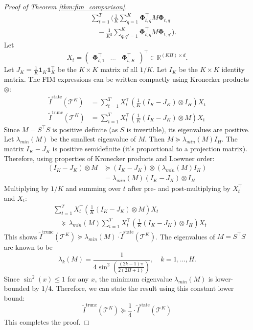 \documentclass{article}
\newcommand{\bPhi}{\mathbf{\Phi}}
\begin{document}
\begin{proof}[Proof of Theorem \ref{thm:fim_comparison}]
\begin{align*}
&\quad \sum_{t=1}^T \Bigg(
\frac{1}{K} \sum_{q=1}^K \bPhi_{t,q}^\top M \bPhi_{t,q} \\
&\qquad - \frac{1}{K^2} \sum_{q,q'=1}^K \bPhi_{t,q}^\top M \bPhi_{t,q'} \Bigg).
\end{align*}
Let
\[
X_t = \begin{pmatrix} \bPhi_{t,1}^\top & \dots & \bPhi_{t,K}^\top \end{pmatrix}^\top \in \mathbb{R}^{(KH) \times d}.
\]
Let $J_K = \frac{1}{K} \mathbf{1}_K \mathbf{1}_K^\top$ be the $K \times K$ matrix of all $1/K$.
Let $I_K$ be the $K \times K$ identity matrix.
The FIM expressions can be written compactly using Kronecker products $\otimes$:
\begin{align*}
\tilde{I}^{\text{state}}(\mathcal{T}^K) &= \sum_{t=1}^T X_t^\top \left( \frac{1}{K} (I_K - J_K) \otimes I_H \right) X_t \\
\tilde{I}^{\text{trunc}}(\mathcal{T}^K) &= \sum_{t=1}^T X_t^\top \left( \frac{1}{K} (I_K - J_K) \otimes M \right) X_t
\end{align*}
Since $M = S^\top S$ is positive definite (as $S$ is invertible), its eigenvalues are positive. Let $\lambda_{min}(M)$ be the smallest eigenvalue of $M$. Then $M \succeq \lambda_{min}(M) I_H$.
The matrix $I_K - J_K$ is positive semidefinite (it's proportional to a projection matrix).
Therefore, using properties of Kronecker products and Loewner order:
\begin{align*}
(I_K - J_K) \otimes M
&\succeq (I_K - J_K) \otimes (\lambda_{min}(M) I_H) \\
&= \lambda_{min}(M) (I_K - J_K) \otimes I_H
\end{align*}
Multiplying by $1/K$ and summing over $t$ after pre- and post-multiplying by $X_t^\top$ and $X_t$:
\begin{align*}
&\sum_{t=1}^T X_t^\top \left( \frac{1}{K} (I_K - J_K) \otimes M \right) X_t \\
&\quad \succeq \lambda_{min}(M) \sum_{t=1}^T X_t^\top \left( \frac{1}{K} (I_K - J_K) \otimes I_H \right) X_t
\end{align*}
This shows $\tilde{I}^{\text{trunc}}(\mathcal{T}^K) \succeq \lambda_{min}(M) \cdot \tilde{I}^{\text{state}}(\mathcal{T}^K)$.
The eigenvalues of $M=S^\top S$ are known to be
\[
\lambda_k(M) = \frac{1}{4 \sin^2\left(\frac{(2k-1)\pi}{2(2H+1)}\right)}, \quad k=1, \dots, H.
\]
Since $\sin^2(x) \le 1$ for any $x$, the minimum eigenvalue $\lambda_{min}(M)$ is lower-bounded by $1/4$.
Therefore, we can state the result using this constant lower bound:
\[ \tilde{I}^{\text{trunc}}(\mathcal{T}^K) \succeq \frac{1}{4} \cdot \tilde{I}^{\text{state}}(\mathcal{T}^K) \]
This completes the proof.
\end{proof}
\end{document}
